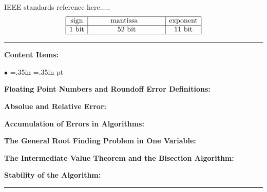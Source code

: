 \documentclass[10pt,fleqn]{article}
\begin{document}
IEEE standards reference here.....
\[
\begin{array}{|c|c|c|}
   \hline
   \makebox{sign} & \ \ \ \ \ \ \ \ \makebox{mantissa} \ \ \ \ \ \ \ \ \ \
                  & \makebox{exponent}\\
   \hline
   \makebox{1 bit} & \makebox{52 bit} & \makebox{11 bit} \\
   \hline
\end{array}
\]

\vskip0.1in\hrule\vskip0.1in
\noindent
{\bf Content Items:}
\begin{list}{$\bullet$}{ \parsep=0pt \listparindent=0pt
\topsep=0pt \rightmargin=.35in \leftmargin=.35in \labelsep=5 pt
\itemsep=2pt}
  \item {\bf Floating Point Numbers and Roundoff Error Definitions:} 
  \item {\bf Absolue and Relative Error:} 
  \item {\bf Accumulation of Errors in Algorithms:} 
  \item {\bf The General Root Finding Problem in One Variable:} 
  \item {\bf The Intermediate Value Theorem and the Bisection Algorithm:} 
  \item {\bf Stability of the Algorithm:} 
\end{list}
\vskip0.1in\hrule\vskip0.1in
\end{document}
